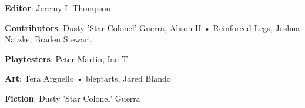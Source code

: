 \begin{description}

\item {\bfseries Editor}: Jeremy L Thompson

\item {\bfseries Contributors}: Dusty 'Star Colonel' Guerra, Alison H • Reinforced Legs, Joshua Natzke, Braden Stewart

\item {\bfseries Playtesters}: Peter Martin, Ian T

\item {\bfseries Art}: Tera Arguello • bleptarts, Jared Blando

\item {\bfseries Fiction}: Dusty 'Star Colonel' Guerra

\end{description}
